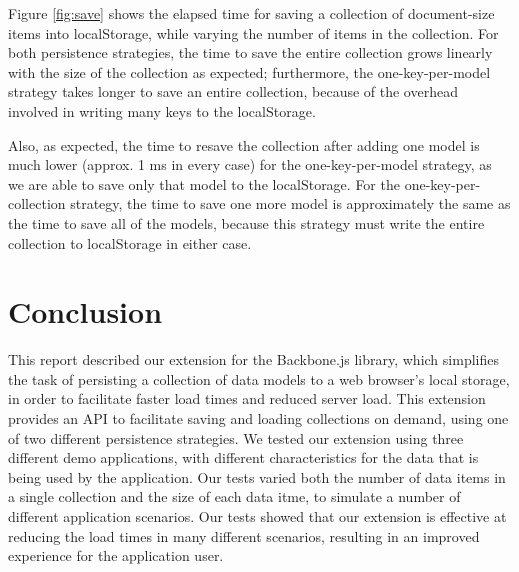 \documentclass[12pt]{article}
\begin{document}
Figure \ref{fig:save} shows the elapsed time for saving a collection of
document-size items into localStorage, while varying the number of items in the
collection. For both persistence strategies, the time to save the entire
collection grows linearly with the size of the collection as expected;
furthermore, the one-key-per-model strategy takes longer to save an entire
collection, because of the overhead involved in writing many keys to the
localStorage.

Also, as expected, the time to resave the collection after adding one model is
much lower (approx. 1 ms in every case) for the one-key-per-model strategy, as
we are able to save only that model to the localStorage. For the
one-key-per-collection strategy, the time to save one more model is
approximately the same as the time to save all of the models, because this
strategy must write the entire collection to localStorage in either case.

\section{Conclusion}

This report described our extension for the Backbone.js library, which
simplifies the task of persisting a collection of data models to a web
browser's local storage, in order to facilitate faster load times and reduced
server load. This extension provides an API to facilitate saving and loading
collections on demand, using one of two different persistence strategies. We
tested our extension using three different demo applications, with different
characteristics for the data that is being used by the application. Our tests
varied both the number of data items in a single collection and the size of
each data itme, to simulate a number of different application scenarios. Our
tests showed that our extension is effective at reducing the load times in many
different scenarios, resulting in an improved experience for the application
user.



\end{document}
